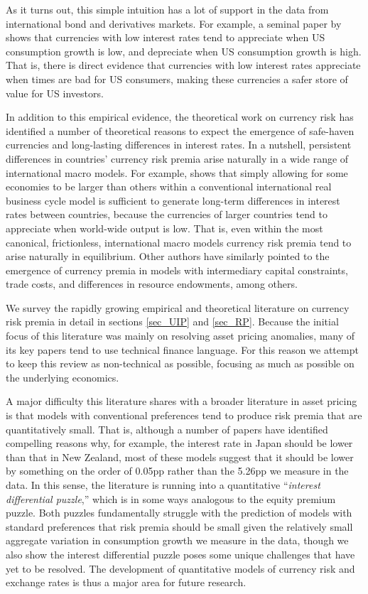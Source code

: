 \documentclass{ar-1col}
\begin{document}
As it turns out, this simple intuition has a lot of support in the data from international bond and derivatives markets. For example, a seminal paper by \citet{LustigVerdelhan2007} shows that currencies with low interest rates tend to appreciate when US consumption growth is low, and depreciate when US consumption growth is high. That is, there is direct evidence that currencies with low interest rates appreciate when times are bad for US consumers, making these currencies a safer store of value for US investors.

In addition to this empirical evidence, the theoretical work on currency risk has identified a number of theoretical reasons to expect the emergence of safe-haven currencies and long-lasting differences in interest rates. In a nutshell, persistent differences in countries' currency risk premia arise naturally in a wide range of international macro models. For example, \citet{Hassan2013} shows that simply allowing for some economies to be larger than others within a conventional international real business cycle model is sufficient to generate long-term differences in interest rates between countries, because the currencies of larger countries tend to appreciate when world-wide output is low. That is, even within the most canonical, frictionless, international macro models currency risk premia tend to arise naturally in equilibrium. Other authors have similarly pointed to the emergence of currency premia in models with intermediary capital constraints, trade costs, and differences in resource endowments, among others.

We survey the rapidly growing empirical and theoretical literature on currency risk premia in detail in sections \ref{sec_UIP} and \ref{sec_RP}. Because the initial focus of this literature was mainly on resolving asset pricing anomalies, many of its key papers tend to use technical finance language. For this reason we attempt to keep this review as non-technical as possible, focusing as much as possible on the underlying economics.

A major difficulty this literature shares with a broader literature in asset pricing is that models with conventional preferences tend to produce risk premia that are quantitatively small. That is, although a number of papers have identified compelling reasons why, for example, the interest rate in Japan should be lower than that in New Zealand, most of these models suggest that it should be lower by something on the order of 0.05pp rather than the 5.26pp we measure in the data. In this sense, the literature is running into a quantitative ``\textit{interest differential puzzle},'' which is in some ways analogous to the equity premium puzzle. Both puzzles fundamentally struggle with the prediction of models with standard preferences that risk premia should be small given the relatively small aggregate variation in consumption growth we measure in the data, though we also show the interest differential puzzle poses some unique challenges that have yet to be resolved. The development of quantitative models of currency risk and exchange rates is thus a major area for future research.
\end{document}
